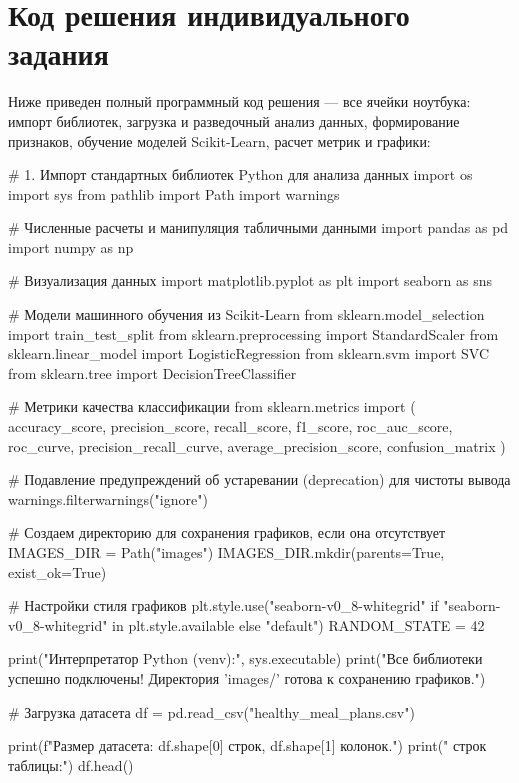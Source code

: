 \documentclass[14pt,a4paper]{extarticle}
\begin{document}
\section{Код решения индивидуального задания}

Ниже приведен полный программный код решения — все ячейки ноутбука: импорт библиотек, загрузка и разведочный анализ данных, формирование признаков, обучение моделей Scikit-Learn, расчет метрик и графики:

\begin{CodeListing}
# 1. Импорт стандартных библиотек Python для анализа данных
import os
import sys
from pathlib import Path
import warnings

# Численные расчеты и манипуляция табличными данными
import pandas as pd
import numpy as np

# Визуализация данных
import matplotlib.pyplot as plt
import seaborn as sns

# Модели машинного обучения из Scikit-Learn
from sklearn.model_selection import train_test_split
from sklearn.preprocessing import StandardScaler
from sklearn.linear_model import LogisticRegression
from sklearn.svm import SVC
from sklearn.tree import DecisionTreeClassifier

# Метрики качества классификации
from sklearn.metrics import (
    accuracy_score,
    precision_score,
    recall_score,
    f1_score,
    roc_auc_score,
    roc_curve,
    precision_recall_curve,
    average_precision_score,
    confusion_matrix
)

# Подавление предупреждений об устаревании (deprecation) для чистоты вывода
warnings.filterwarnings("ignore")

# Создаем директорию для сохранения графиков, если она отсутствует
IMAGES_DIR = Path("images")
IMAGES_DIR.mkdir(parents=True, exist_ok=True)

# Настройки стиля графиков
plt.style.use("seaborn-v0_8-whitegrid" if "seaborn-v0_8-whitegrid" in plt.style.available else "default")
RANDOM_STATE = 42

print("Интерпретатор Python (venv):", sys.executable)
print("Все библиотеки успешно подключены! Директория 'images/' готова к сохранению графиков.")

# Загрузка датасета
df = pd.read_csv("healthy_meal_plans.csv")

print(f"Размер датасета: {df.shape[0]} строк, {df.shape[1]} колонок.")
print(" строк таблицы:")
df.head()


\end{CodeListing}
\end{document}
